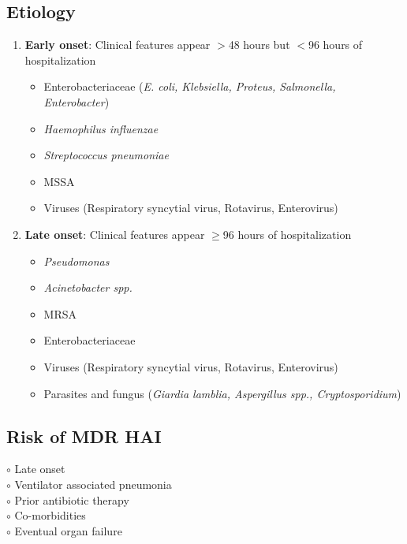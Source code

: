 \documentclass[11pt,a4paper]{report}
\begin{document}
\subsection{Etiology}
\begin{enumerate}
	\item \textbf{Early onset}: Clinical features appear $>$48 hours but $<$96 hours of hospitalization
	\begin{itemize}
		\item Enterobacteriaceae (\textit{E. coli, Klebsiella, Proteus, Salmonella, Enterobacter})
		\item \textit{Haemophilus influenzae}
		\item \textit{Streptococcus pneumoniae}
		\item MSSA
		\item Viruses (Respiratory syncytial virus, Rotavirus, Enterovirus)
	\end{itemize}
	\item \textbf{Late onset}: Clinical features appear $\geq$96 hours of hospitalization
	\begin{itemize}
		\item \textit{Pseudomonas}
		\item \textit{Acinetobacter spp.} 
		\item MRSA
		\item Enterobacteriaceae
		\item Viruses (Respiratory syncytial virus, Rotavirus, Enterovirus)
		\item Parasites and fungus (\textit{Giardia lamblia, Aspergillus spp., Cryptosporidium})
	\end{itemize}
\end{enumerate}

\subsection{Risk of MDR HAI}
$\circ$ Late onset \\
$\circ$ Ventilator associated pneumonia \\
$\circ$ Prior antibiotic therapy \\
$\circ$ Co-morbidities \\
$\circ$ Eventual organ failure
\end{document}
